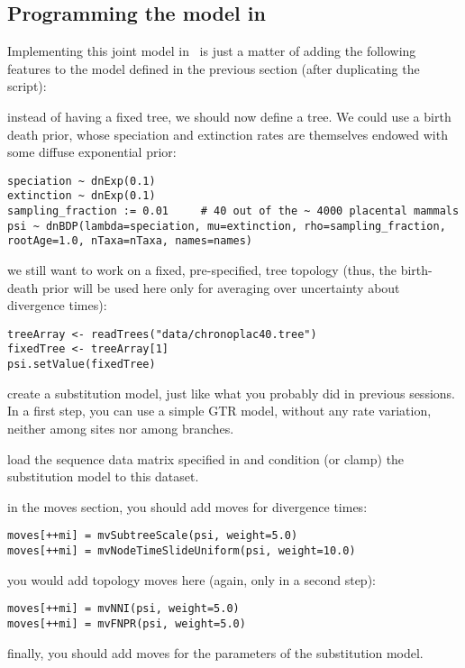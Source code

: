 \subsection{Programming the model in \RevBayes}

Implementing this joint model in \RevBayes~is just a matter of
adding the following features to the model defined in the previous section
(after duplicating the script):

instead of having a fixed tree, we should now define a  tree. We could use a birth death prior, whose speciation and extinction rates are themselves endowed with some diffuse exponential prior:
{\tt \small \begin{snugshade*}
\begin{lstlisting}
speciation ~ dnExp(0.1)
extinction ~ dnExp(0.1)
sampling_fraction := 0.01     # 40 out of the ~ 4000 placental mammals
psi ~ dnBDP(lambda=speciation, mu=extinction, rho=sampling_fraction, rootAge=1.0, nTaxa=nTaxa, names=names)
\end{lstlisting}
\end{snugshade*}}
we still want to work on a fixed, pre-specified, tree topology (thus, the birth-death prior will be used here only for averaging over uncertainty about divergence times):
{\tt \small \begin{snugshade*}
\begin{lstlisting}
treeArray <- readTrees("data/chronoplac40.tree")
fixedTree <- treeArray[1]
psi.setValue(fixedTree)
\end{lstlisting}
\end{snugshade*}}
create a substitution model, just like what you probably did in previous sessions. In a first step, you can use a simple GTR model, without any rate variation, neither among sites nor among branches.

load the sequence data matrix specified in  and condition (or clamp) the substitution model to this dataset.

in the moves section, you should add moves for divergence times:
{\tt \small \begin{snugshade*}
\begin{lstlisting}
moves[++mi] = mvSubtreeScale(psi, weight=5.0)
moves[++mi] = mvNodeTimeSlideUniform(psi, weight=10.0)
\end{lstlisting}
\end{snugshade*}}
you would add topology moves here (again, only in a second step):
{\tt \small \begin{snugshade*}
\begin{lstlisting}
moves[++mi] = mvNNI(psi, weight=5.0)
moves[++mi] = mvFNPR(psi, weight=5.0)
\end{lstlisting}
\end{snugshade*}}
finally, you should add moves for the parameters of the substitution model.

